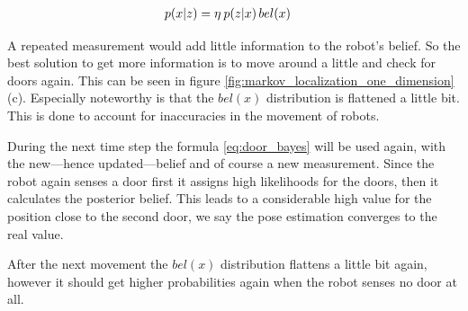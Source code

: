 \documentclass[Thesis.tex]{subfiles}
\begin{document}
\begin{align}
p\!\left({x}\middle|{z}\right) &= \eta\: p\!\left({z}\middle|{x}\right) bel(x) \label{eq:door_bayes}
\end{align}

A repeated measurement would add little information to the robot's belief. So the best solution to get more information is to move around a little and check for doors again. This can be seen in figure \ref{fig:markov_localization_one_dimension}(c). Especially noteworthy is that the $bel(x)$ distribution is flattened a little bit. This is done to account for inaccuracies in the movement of robots.

During the next time step the formula \ref{eq:door_bayes} will be used again, with the new---hence updated---belief and of course a new measurement. Since the robot again senses a door first it assigns high likelihoods for the doors, then it calculates the posterior belief. This leads to a considerable high value for the position close to the second door, we say the pose estimation converges to the real value. 

After the next movement the $bel(x)$ distribution flattens a little bit again, however it should get higher probabilities again when the robot senses no door at all.


\section{}
\end{document}

